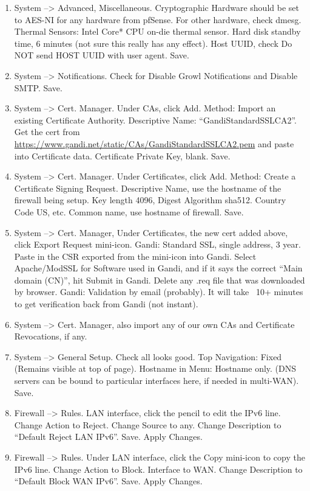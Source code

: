 \begin{enumerate}
 \item System --> Advanced, Miscellaneous. Cryptographic Hardware should be set to AES-NI for any hardware from pfSense. For other hardware, check dmesg. Thermal Sensors: Intel Core* CPU on-die thermal sensor. Hard disk standby time, 6 minutes (not sure this really has any effect). Host UUID, check Do NOT send HOST UUID with user agent. Save.
 \item System --> Notifications. Check for Disable Growl Notifications and Disable SMTP. Save.
 \item System --> Cert. Manager. Under CAs, click Add. Method: Import an existing Certificate Authority. Descriptive Name: ``GandiStandardSSLCA2''. Get the cert from \url{https://www.gandi.net/static/CAs/GandiStandardSSLCA2.pem} and paste into Certificate data. Certificate Private Key, blank. Save.
 \item System --> Cert. Manager. Under Certificates, click Add. Method: Create a Certificate Signing Request. Descriptive Name, use the hostname of the firewall being setup. Key length 4096, Digest Algorithm sha512. Country Code US, etc. Common name, use hostname of firewall. Save.
 \item System --> Cert. Manager, Under Certificates, the new cert added above, click Export Request mini-icon. Gandi: Standard SSL, single address, 3 year. Paste in the CSR exported from the mini-icon into Gandi. Select Apache/ModSSL for Software used in Gandi, and if it says the correct ``Main domain (CN)'', hit Submit in Gandi. Delete any .req file that was downloaded by browser. Gandi: Validation by email (probably). It will take ~10+ minutes to get verification back from Gandi (not instant).
 \item System --> Cert. Manager, also import any of our own CAs and Certificate Revocations, if any.
 \item System --> General Setup. Check all looks good. Top Navigation: Fixed (Remains visible at top of page). Hostname in Menu: Hostname only. (DNS servers can be bound to particular interfaces here, if needed in multi-WAN). Save.
 \item Firewall --> Rules. LAN interface, click the pencil to edit the IPv6 line. Change Action to Reject. Change Source to any. Change Description to ``Default Reject LAN IPv6''. Save. Apply Changes.
 \item Firewall --> Rules. Under LAN interface, click the Copy mini-icon to copy the IPv6 line. Change Action to Block. Interface to WAN. Change Description to ``Default Block WAN IPv6''. Save. Apply Changes.

\end{enumerate}
